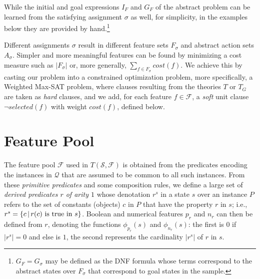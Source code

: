 \documentclass[letterpaper]{article} %
\newcommand{\Omit}[1]{}
\newtheorem{theorem}[definition]{Theorem}
\newcommand{\Q}{\mathcal{Q}}
\newcommand{\F}{\mathcal{F}}
\renewcommand{\S}{\mathcal{S}}
\begin{document}
While the initial and goal expressions $I_F$ and $G_F$ of the abstract problem can be learned
from the satisfying assignment $\sigma$ as well, for simplicity, in the examples below they are
provided by hand.\footnote{$G_F = G_{\sigma}$ may be defined as the DNF formula whose terms
  correspond to the abstract states over $F_{\sigma}$ that correspond to goal states in
  the sample.
  }



\Omit{
Due to  \eqref{eq:d1} and \eqref{eq:goal} that force the selected features in $F_{\sigma}$
to   distinguish goal  from non-goal states, we have that:

\begin{theorem}
For a satisfying assignment $\sigma$  of $T(\S,\F)$,
$s$ is expanded goal   state in $\S$  iff  $s$ satisfies  $G_F=G_{\sigma}$.
\end{theorem}
}
%

Different assignments $\sigma$ result in different feature sets $F_{\sigma}$
and abstract action sets $A_{\sigma}$. Simpler and more meaningful features can be found
by minimizing a cost measure such as $|F_{\sigma}|$
or, more generally, $\sum_{f \in F_{\sigma}} cost(f)$.
We achieve this by casting our problem
into a constrained optimization problem, more specifically, a Weighted Max-SAT problem,
where clauses resulting from the theories $T$ or $T_G$ are taken as \emph{hard} clauses,
and we add, for each feature $f \in \F$, a
\emph{soft} unit clause $\neg selected(f)$ with weight $cost(f)$, defined below.


\section{Feature Pool}

The feature pool $\F$ used in $T(\S,\F)$ is obtained
from the   predicates encoding  the instances in $\Q$
that are assumed to be common to all such instances.
From these \emph{primitive predicates} and some composition rules,
we define a large set of \emph{derived predicates $r$ of arity $1$}
whose denotation $r^s$ in a state $s$ over an instance $P$
refers to the set of constants (objects) $c$ in $P$ that
have the property $r$ in $s$; i.e., $r^s=\{c \, | \, r(c) \hbox{ is true in $s$}\}$.
Boolean and numerical features $p_r$ and $n_r$ can then be defined from  $r$,
denoting the functions $\phi_{p_r}(s)$ and $\phi_{n_r}(s)$: the first is $0$
if $|r^s|=0$ and else is $1$, the second represents the cardinality $|r^s|$ of $r$ in $s$.
\end{document}
